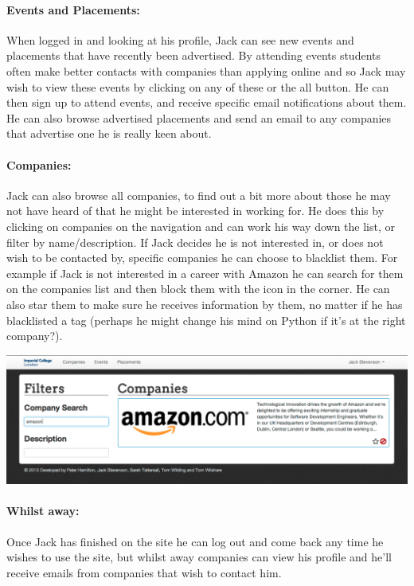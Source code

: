   \paragraph{Events and Placements:}
    When logged in and looking at his profile, Jack can see new events and placements that have recently been advertised. By attending events students often make better contacts with companies than applying online and so Jack may wish to view these events by clicking on any of these or the all button. He can then sign up to attend events, and receive specific email notifications about them.
    He can also browse advertised placements and send an email to any companies that advertise one he is really keen about.

  \paragraph{Companies:}
    Jack can also browse all companies, to find out a bit more about those he may not have heard of that he might be interested in working for. He does this by clicking on companies on the navigation and can work his way down the list, or filter by name/description.
    If Jack decides he is not interested in, or does not wish to be contacted by, specific companies he can choose to blacklist them. For example if Jack is not interested in a career with Amazon he can search for them on the companies list and then block them with the icon in the corner. He can also star them to make sure he receives information by them, no matter if he has blacklisted a tag (perhaps he might change his mind on Python if it's at the right company?).

    \includegraphics[scale=0.3]{images/user_experiences/student/block_amazon}

  \paragraph{Whilst away:}
    Once Jack has finished on the site he can log out and come back any time he wishes to use the site, but whilst away companies can view his profile and he'll receive emails from companies that wish to contact him.


